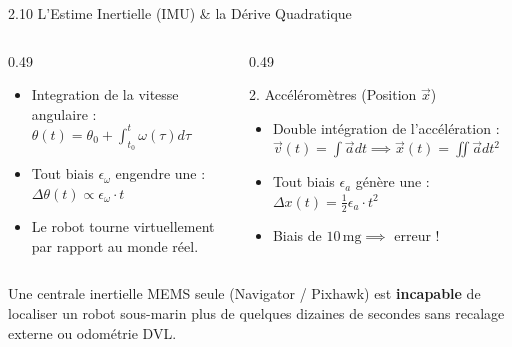 \begin{frame}{2.10 L'Estime Inertielle (IMU) \& la Dérive Quadratique}
  \begin{columns}[T]
    \begin{column}{0.49\textwidth}
      \begin{block}{}
        \scriptsize
        \begin{itemize}
          \item Integration de la vitesse angulaire :
          $\theta(t) = \theta_0 + \int_{t_0}^t \omega(\tau) d\tau$
          \item Tout biais $\epsilon_\omega$ engendre une  :
          $\Delta \theta(t) \propto \epsilon_\omega \cdot t$
          \item Le robot tourne virtuellement par rapport au monde réel.
        \end{itemize}
      \end{block}
    \end{column}

    \begin{column}{0.49\textwidth}
      \begin{alertblock}{2. Accéléromètres (Position $\vec{x}$)}
        \scriptsize
        \begin{itemize}
          \item Double intégration de l'accélération :
          $\vec{v}(t) = \int \vec{a} dt \implies \vec{x}(t) = \iint \vec{a} dt^2$
          \item Tout biais $\epsilon_a$ génère une  :
          $\Delta x(t) = \frac{1}{2} \epsilon_a \cdot t^2$
          \item Biais de $10\,\text{mg} \implies$ erreur  !
        \end{itemize}
      \end{alertblock}
    \end{column}
  \end{columns}

  \vspace{0.2em}
  \begin{block}{}
    \scriptsize
    Une centrale inertielle MEMS seule (Navigator / Pixhawk) est \textbf{incapable} de localiser un robot sous-marin plus de quelques dizaines de secondes sans recalage externe ou odométrie DVL.
  \end{block}
\end{frame}

